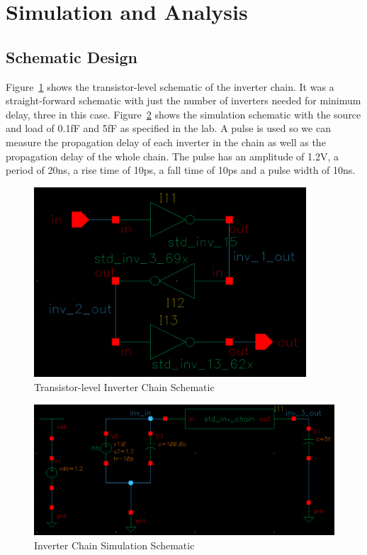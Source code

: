 \documentclass[12pt]{article}
\begin{document}
\section{Simulation and Analysis}
\subsection{Schematic Design}
Figure~\ref{fig:inv_chain_schem} shows the transistor-level schematic of the inverter chain. It was a straight-forward
schematic with just the number of inverters needed for minimum delay, three in this case. Figure~\ref{fig:inv_chain_sim}
shows the simulation schematic with the source and load of 0.1fF and 5fF as specified in the lab.
A pulse is used so we can measure the propagation delay of each inverter in the chain as well as the propagation delay
of the whole chain. The pulse has an amplitude of 1.2V, a period of 20ns, a rise time of 10ps, a fall time of 10ps and
a pulse width of 10ns.
\begin{figure}[!htb]
    \centering
    \includegraphics[width=4in]{figures/inv_chain_schem.png}
    \caption{Transistor-level Inverter Chain Schematic}\label{fig:inv_chain_schem}
\end{figure}
\begin{figure}[!htb]
    \centering
    \includegraphics[width=5in]{figures/inv_chain_sim.png}
    \caption{Inverter Chain Simulation Schematic}\label{fig:inv_chain_sim}
\end{figure}
\end{document}
